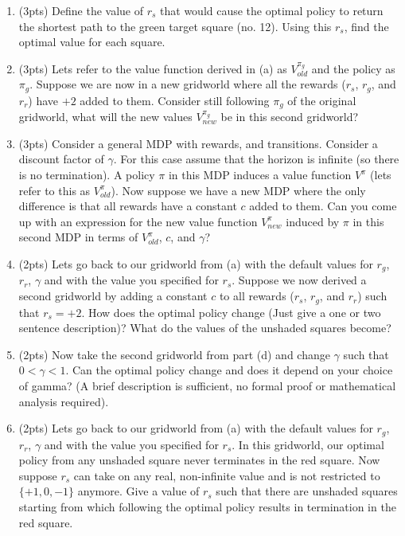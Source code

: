 \begin{enumerate}[label=(\alph*)]
\item (3pts) Define the value of $r_s$ that would cause the optimal policy to return the shortest path to the green target square (no. 12). Using this $r_s$, find the optimal value for each square.


\item (3pts) Lets refer to the value function derived in (a) as $V^{\pi_g}_{old}$ and the policy as $\pi_g$. Suppose we are now in a new gridworld where all the rewards ($r_s$, $r_g$, and $r_r$) have $+2$ added to them. Consider still following $\pi_g$ of the original gridworld, what will the new values $V^{\pi_g}_{new}$ be in this second gridworld?

\item (3pts) Consider a general MDP with rewards, and transitions. Consider a discount factor of $\gamma$. For this case assume that the horizon is infinite (so there is no termination). A policy $\pi$ in this MDP induces a value function $V^\pi$ (lets refer to this as $V^\pi_{old}$). Now suppose we have a new MDP where the only difference is that all rewards have a constant $c$ added to them. Can you come up with an expression for the new value function $V^\pi_{new}$ induced by $\pi$ in this second MDP in terms of $V^\pi_{old}$, $c$, and $\gamma$?

\item (2pts) Lets go back to our gridworld from (a) with the default values for $r_g$, $r_r$, $\gamma$ and with the value you specified for $r_s$. Suppose we now derived a second gridworld by adding a constant $c$ to all rewards ($r_s$, $r_g$, and $r_r$) such that $r_s = +2$. How does the optimal policy change (Just give a one or two sentence description)? What do the values of the unshaded squares become?

\item (2pts) Now take the second gridworld from part (d) and change $\gamma$ such that $0 < \gamma < 1$. Can the optimal policy change and does it depend on your choice of gamma? (A brief description is sufficient, no formal proof or mathematical analysis required).

\item (2pts) Lets go back to our gridworld from (a) with the default values for $r_g$, $r_r$, $\gamma$ and with the value you specified for $r_s$. In this gridworld, our optimal policy from any unshaded square never terminates in the red square. Now suppose $r_s$ can take on any real, non-infinite value and is not restricted to $\{+1, 0, -1\}$ anymore. Give a value of $r_s$ such that there are unshaded squares starting from which following the optimal policy results in termination in the red square.


\end{enumerate}